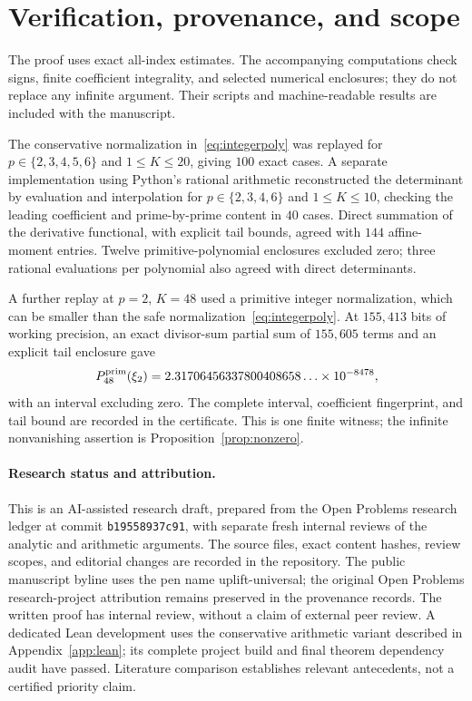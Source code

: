 \documentclass[11pt,letterpaper]{article}
\numberwithin{equation}{section}
\theoremstyle{remark}\newtheorem{remark}[theorem]{Remark}
\begin{document}
\section{Verification, provenance, and scope}
The proof uses exact all-index estimates. The accompanying computations check signs, finite coefficient integrality, and selected numerical enclosures; they do not replace any infinite argument. Their scripts and machine-readable results are included with the manuscript.

The conservative normalization in~\eqref{eq:integerpoly} was replayed for $p\in\{2,3,4,5,6\}$ and $1\le K\le20$, giving $100$ exact cases. A separate implementation using Python's rational arithmetic reconstructed the determinant by evaluation and interpolation for $p\in\{2,3,4,6\}$ and $1\le K\le10$, checking the leading coefficient and prime-by-prime content in $40$ cases. Direct summation of the derivative functional, with explicit tail bounds, agreed with $144$ affine-moment entries. Twelve primitive-polynomial enclosures excluded zero; three rational evaluations per polynomial also agreed with direct determinants.

A further replay at $p=2$, $K=48$ used a primitive integer normalization, which can be smaller than the safe normalization~\eqref{eq:integerpoly}. At $155{,}413$ bits of working precision, an exact divisor-sum partial sum of $155{,}605$ terms and an explicit tail enclosure gave
\begin{equation*}
 P^{\rm prim}_{48}(\xi_2)
 =2.31706456337800408658\ldots\times10^{-8478},
\end{equation*}
with an interval excluding zero. The complete interval, coefficient fingerprint, and tail bound are recorded in the certificate. This is one finite witness; the infinite nonvanishing assertion is Proposition~\ref{prop:nonzero}.

\paragraph{Research status and attribution.}
This is an AI-assisted research draft, prepared from the Open Problems research ledger at commit \texttt{b19558937c91}, with separate fresh internal reviews of the analytic and arithmetic arguments. The source files, exact content hashes, review scopes, and editorial changes are recorded in the repository. The public manuscript byline uses the pen name uplift-universal; the original Open Problems research-project attribution remains preserved in the provenance records. The written proof has internal review, without a claim of external peer review. A dedicated Lean development uses the conservative arithmetic variant described in Appendix~\ref{app:lean}; its complete project build and final theorem dependency audit have passed. Literature comparison establishes relevant antecedents, not a certified priority claim.
\end{document}
